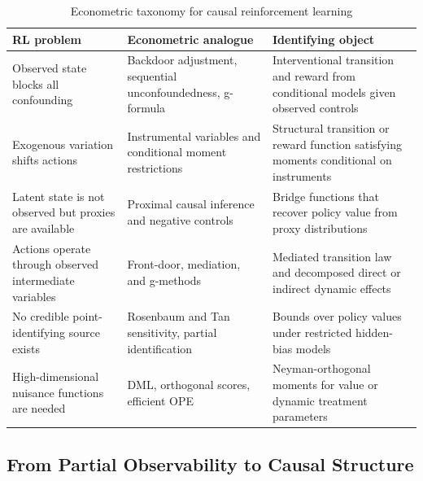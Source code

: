 \begin{table}[htbp]
\centering
\caption{Econometric taxonomy for causal reinforcement learning}
\label{tab:causal_rl_taxonomy}
\begin{tabularx}{\textwidth}{>{\raggedright\arraybackslash}p{}>{\raggedright\arraybackslash}p{}>{\raggedright\arraybackslash}X}
\toprule
RL problem & Econometric analogue & Identifying object \\
\midrule
Observed state blocks all confounding & Backdoor adjustment, sequential unconfoundedness, g-formula & Interventional transition and reward from conditional models given observed controls \\
Exogenous variation shifts actions & Instrumental variables and conditional moment restrictions & Structural transition or reward function satisfying moments conditional on instruments \\
Latent state is not observed but proxies are available & Proximal causal inference and negative controls & Bridge functions that recover policy value from proxy distributions \\
Actions operate through observed intermediate variables & Front-door, mediation, and g-methods & Mediated transition law and decomposed direct or indirect dynamic effects \\
No credible point-identifying source exists & Rosenbaum and Tan sensitivity, partial identification & Bounds over policy values under restricted hidden-bias models \\
High-dimensional nuisance functions are needed & DML, orthogonal scores, efficient OPE & Neyman-orthogonal moments for value or dynamic treatment parameters \\
\bottomrule
\end{tabularx}
\end{table}

\subsection{From Partial Observability to Causal Structure}
\label{subsec:pomdp_to_causal}

